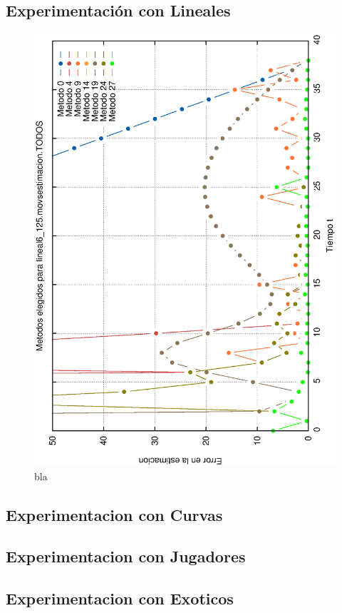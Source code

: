 \subsection{Experimentación con Lineales}
\begin{figure}[H]
\includegraphics[width=\textwidth]{img/lineal6_125.movsestimacion.TODOS.elegidos.ps}
     \caption{bla}
\end{figure}

\subsection{Experimentacion con Curvas}

\subsection{Experimentacion con Jugadores}

\subsection{Experimentacion con Exoticos}
